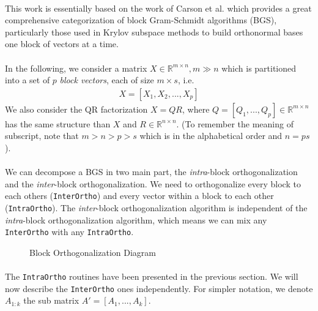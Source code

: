 \paragraph*{}
This work is essentially based on the work of Carson et al.\cite{Carson2022} which provides a great comprehensive categorization of block Gram-Schmidt algorithms (BGS), particularly those used in Krylov subspace methods to build orthonormal bases one block of vectors at a time.

\paragraph*{}
In the following, we consider a matrix $X \in \mathbb{R}^{m\times n}, m\gg n$ which is partitioned into a set of $p$ \textit{block vectors}, each of size $m\times s$, i.e.
\begin{align*}
    X = [X_1,X_2,...,X_p]
\end{align*}
We also consider the QR factorization $X=QR$, where $Q=[Q_1,...,Q_p] \in \mathbb{R}^{m \times n}$ has the same structure than $X$ and $R\in \mathbb{R}^{n \times n}$.
(To remember the meaning of subscript, note that $m > n > p > s$ which is in the alphabetical order and $n=ps$).

\paragraph*{}
We can decompose a BGS in two main part, the \textit{intra}-block orthogonalization and the \textit{inter}-block orthogonalization. We need to orthogonalize every block to each others (\texttt{InterOrtho}) and every vector within a block to each other (\texttt{IntraOrtho}). The \textit{inter}-block orthogonalization algorithm is independent of the \textit{intra}-block orthogonalization algorithm, which means we can mix any \texttt{InterOrtho} with any \texttt{IntraOrtho}.

\begin{figure}[h]
    \centering
    
    \caption{Block Orthogonalization Diagram}
    \label{fig:block_orthogo}
\end{figure}

\paragraph*{}
The \texttt{IntraOrtho} routines have been presented in the previous section. We will now describe the \texttt{InterOrtho} ones independently. For simpler notation, we denote $A_{1:k}$ the sub matrix $A' = [A_1,...,A_k]$.

